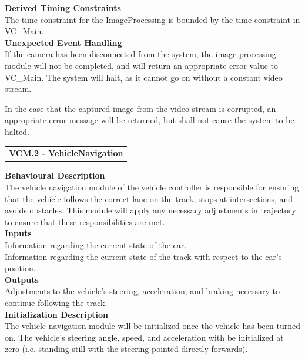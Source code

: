\documentclass [10pt]{article}
\begin{document}
\textbf{Derived Timing Constraints} \\
  The time constraint for the ImageProcessing is bounded by the time constraint in VC\_Main.\\
    
\textbf{Unexpected Event Handling} \\
    If the camera has been disconnected from the system, the image processing module will not be completed,  and will return an appropriate error value to VC\_Main. The system will halt, as it cannot go on without a constant video stream. 
    
    In the case that the captured image from the video stream is corrupted, an appropriate error message will be returned, but shall not cause the system to be halted. \\
    
    
    
    
    

\begin{longtable}{p{}}
\rowcolor{tableCell}\textbf{VCM.2 - VehicleNavigation} \\
\end{longtable}

\textbf{Behavioural Description} \\
    The vehicle navigation module of the vehicle controller is responsible for ensuring that the vehicle follows the correct lane on the track, stops at intersections, and avoids obstacles. This module will apply any necessary adjustments in trajectory to ensure that these responsibilities are met.\\

\textbf{Inputs} \\
Information regarding the current state of the car. \\
Information regarding the current state of the track with respect to the car's position. \\

\textbf{Outputs} \\
 Adjustments to the vehicle's steering, acceleration, and braking necessary to continue following the track.\\

\textbf{Initialization Description} \\
The vehicle navigation module will be initialized once the vehicle has been turned on. The vehicle's steering angle, speed, and acceleration with be initialized at zero (i.e. standing still with the steering pointed directly forwards). \\
\end{document}
